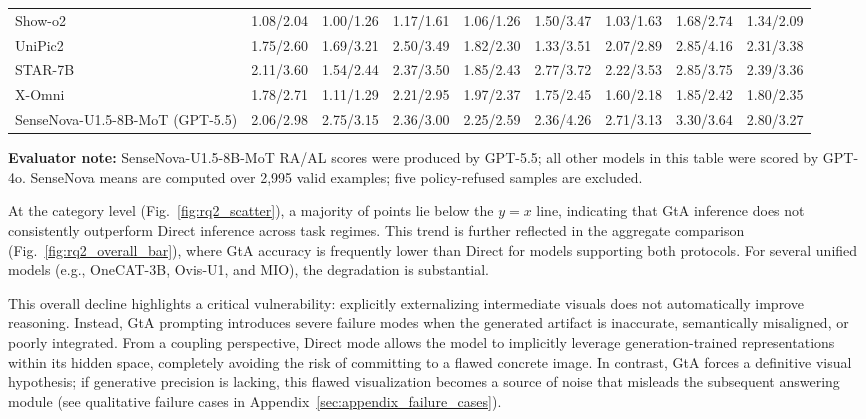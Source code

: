 \documentclass{article}
\theoremstyle{plain}
\theoremstyle{definition}
\theoremstyle{remark}
\begin{document}
\begin{table}[!t]
{\begin{tabular}{@{}lcccccccc@{}}
Show-o2 & 1.08/2.04 & 1.00/1.26 & 1.17/1.61 & 1.06/1.26 & 1.50/3.47 & 1.03/1.63 & 1.68/2.74 & 1.34/2.09 \\
UniPic2 & 1.75/2.60 & 1.69/3.21 & 2.50/3.49 & 1.82/2.30 & 1.33/3.51 & 2.07/2.89 & 2.85/4.16 & 2.31/3.38 \\
STAR-7B & 2.11/3.60 & 1.54/2.44 & 2.37/3.50 & 1.85/2.43 & 2.77/3.72 & 2.22/3.53 & 2.85/3.75 & 2.39/3.36 \\
X-Omni & 1.78/2.71 & 1.11/1.29 & 2.21/2.95 & 1.97/2.37 & 1.75/2.45 & 1.60/2.18 & 1.85/2.42 & 1.80/2.35 \\
SenseNova-U1.5-8B-MoT (GPT-5.5) & 2.06/2.98 & 2.75/3.15 & 2.36/3.00 & 2.25/2.59 & 2.36/4.26 & 2.71/3.13 & 3.30/3.64 & 2.80/3.27 \\
\bottomrule
\end{tabular}
}
\vspace{2pt}
{\scriptsize \raggedright \textbf{Evaluator note:} SenseNova-U1.5-8B-MoT RA/AL scores were produced by GPT-5.5; all other models in this table were scored by GPT-4o. SenseNova means are computed over 2,995 valid examples; five policy-refused samples are excluded.\par}
\end{table}

At the category level (Fig.~\ref{fig:rq2_scatter}), a majority of points lie below the $y=x$ line, indicating that GtA inference does not consistently outperform Direct inference across task regimes. This trend is further reflected in the aggregate comparison (Fig.~\ref{fig:rq2_overall_bar}), where GtA accuracy is frequently lower than Direct for models supporting both protocols. For several unified models (e.g., OneCAT-3B, Ovis-U1, and MIO), the degradation is substantial. 

This overall decline highlights a critical vulnerability: explicitly externalizing intermediate visuals does not automatically improve reasoning. Instead, GtA prompting introduces severe failure modes when the generated artifact is inaccurate, semantically misaligned, or poorly integrated. From a coupling perspective, Direct mode allows the model to implicitly leverage generation-trained representations within its hidden space, completely avoiding the risk of committing to a flawed concrete image. In contrast, GtA forces a definitive visual hypothesis; if generative precision is lacking, this flawed visualization becomes a source of noise that misleads the subsequent answering module (see qualitative failure cases in Appendix~\ref{sec:appendix_failure_cases}).
\end{document}
